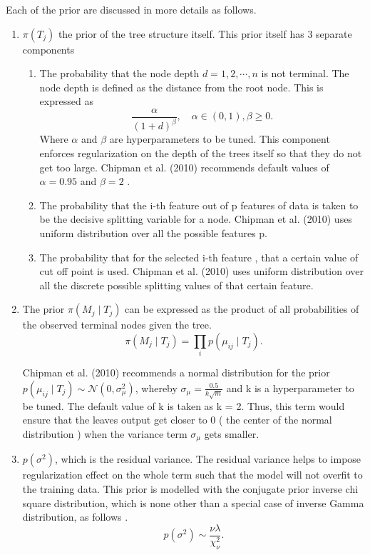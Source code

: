 \documentclass{usiinftr}
\begin{document}
Each of the prior are discussed in more details as follows.
\begin{enumerate}
\item $\pi(T_j)$ the prior of the tree structure itself. This prior itself has 3 separate components
			\begin{enumerate}
				\item The probability that the node depth $d = 1,2,\cdots,n$ is not terminal. The node depth is defined as the distance from the root node. This is expressed as 
			\begin{equation}\frac{\alpha}{(1+d)^{\beta}}, \quad \alpha \in (0,1), \beta \geq 0 . \end{equation}
			Where $\alpha$ and $\beta$ are hyperparameters to be tuned. This component enforces regularization on the depth of the trees itself so that they do not get too large. Chipman et al. (2010) recommends default values of $\alpha = 0.95$ and $\beta =2$ \cite{7}.
				\item The probability that the i-th feature out of p features of data is taken to be the decisive splitting variable for a node. Chipman et al. (2010) \cite{7} uses uniform distribution over all the possible features p.
				\item The probability that for the selected i-th feature , that a certain value of cut off point is used. Chipman et al. (2010) \cite{7} uses uniform distribution over all the discrete possible splitting values of that certain feature.
			\end{enumerate} 
\item The prior $\pi(M_j \mid T_j)$ can be expressed as the product of all probabilities of the observed terminal nodes given the tree.
\begin{equation}\pi(M_j \mid T_j) = \prod_i p(\mu_{ij} \mid T_j). \end{equation}

Chipman et al. (2010) \cite{7} recommends a normal distribution for the prior $p( \mu_{ij} \mid T_j) \sim \mathcal{N}(0, \sigma^2_{ \mu })$, whereby $ \sigma_{ \mu } = \frac{0.5}{k \sqrt{m}}$  and k is a hyperparameter to be tuned. The default value of k is taken as k = 2. Thus, this term would ensure that the leaves output get closer to 0 ( the center of the normal distribution ) when the variance term $\sigma_{ \mu}$ gets smaller.
\item $p(\sigma^2)$, which is the residual variance. The residual variance helps to impose regularization effect on the whole term such that the model will not overfit to the training data. This prior is modelled with the conjugate prior inverse chi square distribution, which is none other than a special case of inverse Gamma distribution, as follows \cite{7}.
\begin{equation}p(\sigma^2) \sim \frac{\nu \lambda}{\chi_{\nu}^2}. \end{equation}


\end{enumerate}
\end{document}
